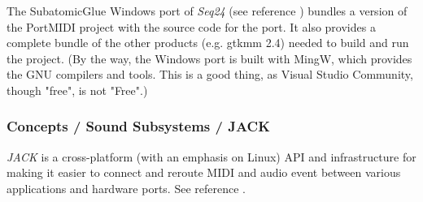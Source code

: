    The SubatomicGlue Windows port of \textsl{Seq24} (see reference
   \cite{subatomicglue}) bundles a version of the PortMIDI project with the
   source code for the port.  It also provides a complete bundle of the
   other products (e.g. gtkmm 2.4) needed to build and run the project.
   (By the way, the Windows port is built with
   MingW, which provides the GNU compilers and tools.  This is a good thing,
   as Visual Studio Community, though "free", is not "Free".)

\subsubsection{Concepts / Sound Subsystems / JACK}
\label{subsubsec:concepts_sound_jack}

   \textsl{JACK} is a cross-platform (with an emphasis on Linux)
   API and infrastructure for making it easier to connect and reroute MIDI
   and audio event between various applications and hardware ports.
   See reference \cite{jack}.

